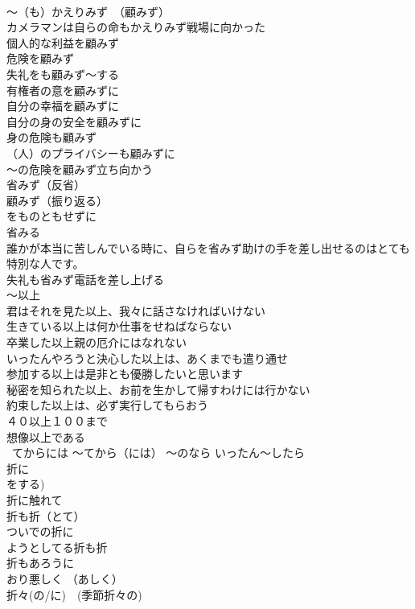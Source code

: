 \documentclass[8pt]{extreport}
\begin{document}
\begin{CJK}{UTF8}{min}
\\	～（も）かえりみず　（顧みず）	
\\	カメラマンは自らの命もかえりみず戦場に向かった　
\\	個人的な利益を顧みず 
\\	危険を顧みず 
\\	失礼をも顧みず～する 
\\	有権者の意を顧みずに 
\\	自分の幸福を顧みずに 
\\	自分の身の安全を顧みずに 
\\	身の危険も顧みず 
\\	（人）のプライバシーも顧みずに 
\\	～の危険を顧みず立ち向かう 
\\	省みず（反省）　
\\	顧みず（振り返る） 
\\	をものともせずに 
\\	省みる 
\\	誰かが本当に苦しんでいる時に、自らを省みず助けの手を差し出せるのはとても特別な人です。 
\\	失礼も省みず電話を差し上げる 
\\	～以上 
\\	君はそれを見た以上、我々に話さなければいけない 
\\	生きている以上は何か仕事をせねばならない 
\\	卒業した以上親の厄介にはなれない 
\\	いったんやろうと決心した以上は、あくまでも遣り通せ 
\\	参加する以上は是非とも優勝したいと思います 
\\	秘密を知られた以上、お前を生かして帰すわけには行かない 
\\	約束した以上は、必ず実行してもらおう 
\\	４０以上１００まで 
\\	想像以上である 
\\	~てからには ～てから（には） ～のなら いったん～したら
\\	折に
\\	をする) 
\\	折に触れて 
\\	折も折（とて） 
\\	ついでの折に 
\\	ようとしてる折も折 
\\	折もあろうに 
\\	おり悪しく （あしく） 
\\	折々(の/に)　(季節折々の) 

\end{CJK}
\end{document}
